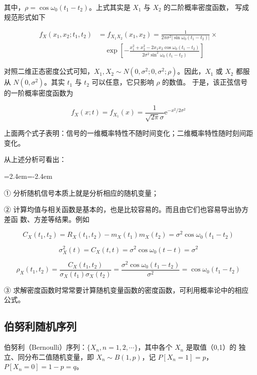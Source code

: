 \documentclass[11pt,openany,UTF8]{ctexbook}
\newcommand{\eu}{\mathrm{e}}                       %
\newenvironment{citemize}
  {\begin{list}{}{\leftmargin=2.4em\itemindent=-2.4em\itemsep=1pt\topsep=3pt\parsep=0pt}}
  {\end{list}}
\begin{document}
其中\nobreak，$\rho = \cos\omega_0(t_1-t_2)$\nobreak。上式其实是 $X_1$ 与 $X_2$ 的二阶概率密度函数\nobreak，
写成规范形式如下

\begin{equation}
\begin{split}
f_X(x_1,x_2;t_1,t_2) &= f_{X_1X_2}(x_1,x_2)
  = \frac{1}{2\pi\sigma^2\lvert\sin\omega_0(t_1-t_2)\rvert}\times\\
&\quad \exp\left[-\frac{x_1^2+x_2^2-2x_1x_2\cos\omega_0(t_1-t_2)}
   {2\sigma^2\sin^2\omega_0(t_1-t_2)}\right]
\end{split}
\label{eq:2.5}
\end{equation}

对照二维正态密度公式可知\nobreak，$X_1,X_2\sim N(0,\sigma^2;0,\sigma^2;\rho)$\nobreak。因此\nobreak，$X_1$ 或
$X_2$ 都服从 $N(0,\sigma^2)$\nobreak。其实 $t_1$ 与 $t_2$ 可以任意\nobreak，它只影响 $\rho$ 的数值\nobreak。
于是\nobreak，该正弦信号的一阶概率密度函数为

\begin{equation}
f_X(x;t) = f_{X_1}(x) = \frac{1}{\sqrt{2\pi}\sigma}\eu^{-x^2/2\sigma^2}
\label{eq:2.6}
\end{equation}

上面两个式子表明\nobreak：信号的一维概率特性不随时间变化\nobreak；二维概率特性随时刻间距变化\nobreak。

从上述分析可看出\nobreak：

\begin{citemize}
\item ① 分析随机信号本质上就是分析相应的随机变量\nobreak；
\item ② 计算均值与相关函数是基本的\nobreak，也是比较容易的\nobreak。而且由它们也容易导出协方差函
数\nobreak、方差等结果\nobreak。例如

\[
C_X(t_1,t_2) = R_X(t_1,t_2) - m_X(t_1)m_X(t_2) = \sigma^2\cos\omega_0(t_1-t_2)
\]

\[
\sigma_X^2(t) = C_X(t,t) = \sigma^2\cos\omega_0(t-t) = \sigma^2
\]

\[
\rho_X(t_1,t_2) = \frac{C_X(t_1,t_2)}{\sigma_X(t_1)\sigma_X(t_2)}
  = \frac{\sigma^2\cos\omega_0(t_1-t_2)}{\sigma^2} = \cos\omega_0(t_1-t_2)
\]

\item ③ 求解密度函数时常常要计算随机变量函数的密度函数\nobreak，可利用概率论中的相应
公式\nobreak。
\end{citemize}

\subsection{伯努利随机序列}
伯努利（Bernoulli\nobreak）序列\nobreak：$\{X_n,n=1,2,\cdots\}$\nobreak，其中各个 $X_n$ 是取值（0,1\nobreak）的
独立\nobreak、同分布二值随机变量\nobreak，即 $X_n\sim B(1,p)$\nobreak，记 $P[X_n=1]=p$\nobreak，$P[X_n=0]=1-p=q$\nobreak。
\end{document}
